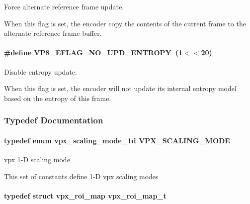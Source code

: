 Force alternate reference frame update. 

When this flag is set, the encoder copy the contents of the current frame to the alternate reference frame buffer. \hypertarget{group__vp8__encoder_ga5b91ad179910d4efc23aef66c7b2148b}{
\paragraph[{V\+P8\+\_\+\+E\+F\+L\+A\+G\+\_\+\+N\+O\+\_\+\+U\+P\+D\+\_\+\+E\+N\+T\+R\+O\+P\+Y}]{\setlength{\rightskip}{0pt plus 5cm}\#define V\+P8\+\_\+\+E\+F\+L\+A\+G\+\_\+\+N\+O\+\_\+\+U\+P\+D\+\_\+\+E\+N\+T\+R\+O\+P\+Y~(1$<$$<$20)}}\label{group__vp8__encoder_ga5b91ad179910d4efc23aef66c7b2148b}


Disable entropy update. 

When this flag is set, the encoder will not update its internal entropy model based on the entropy of this frame. 

\subsubsection{Typedef Documentation}
\hypertarget{group__vp8__encoder_ga100ca891ad96995e61780ae777bf8663}{
\paragraph[{V\+P\+X\+\_\+\+S\+C\+A\+L\+I\+N\+G\+\_\+\+M\+O\+D\+E}]{\setlength{\rightskip}{0pt plus 5cm}typedef enum {\bf vpx\+\_\+scaling\+\_\+mode\+\_\+1d}  {\bf V\+P\+X\+\_\+\+S\+C\+A\+L\+I\+N\+G\+\_\+\+M\+O\+D\+E}}}\label{group__vp8__encoder_ga100ca891ad96995e61780ae777bf8663}


vpx 1-\/\+D scaling mode 

This set of constants define 1-\/\+D vpx scaling modes \hypertarget{group__vp8__encoder_ga5be1a94d436a5e9296f5be06f57ccbd1}{
\paragraph[{vpx\+\_\+roi\+\_\+map\+\_\+t}]{\setlength{\rightskip}{0pt plus 5cm}typedef struct {\bf vpx\+\_\+roi\+\_\+map}  {\bf vpx\+\_\+roi\+\_\+map\+\_\+t}}}\label{group__vp8__encoder_ga5be1a94d436a5e9296f5be06f57ccbd1}



